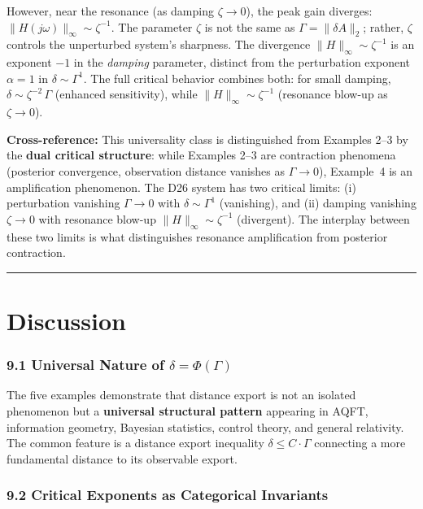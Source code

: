 \documentclass[
]{article}
\begin{document}
However, near the resonance (as damping $\zeta \to 0$), the peak gain diverges: $\|H(j\omega)\|_\infty \sim \zeta^{-1}$. The parameter $\zeta$ is not the same as $\Gamma = \|\delta A\|_2$; rather, $\zeta$ controls the unperturbed system's sharpness. The divergence $\|H\|_\infty \sim \zeta^{-1}$ is an exponent $-1$ in the \emph{damping} parameter, distinct from the perturbation exponent $\alpha = 1$ in $\delta \sim \Gamma^1$. The full critical behavior combines both: for small damping, $\delta \sim \zeta^{-2}\,\Gamma$ (enhanced sensitivity), while $\|H\|_\infty \sim \zeta^{-1}$ (resonance blow-up as $\zeta \to 0$).

\textbf{Cross-reference:} This universality class is distinguished from Examples 2--3 by the \textbf{dual critical structure}: while Examples 2--3 are contraction phenomena (posterior convergence, observation distance vanishes as $\Gamma \to 0$), Example~4 is an amplification phenomenon. The D26 system has two critical limits: (i) perturbation vanishing $\Gamma \to 0$ with $\delta \sim \Gamma^1$ (vanishing), and (ii) damping vanishing $\zeta \to 0$ with resonance blow-up $\|H\|_\infty \sim \zeta^{-1}$ (divergent). The interplay between these two limits is what distinguishes resonance amplification from posterior contraction.

\begin{center}\rule{0.5\linewidth}{0.5pt}\end{center}


\section{Discussion}\label{discussion}

\subsubsection{\texorpdfstring{9.1 Universal Nature of
\(\delta = \Phi(\Gamma)\)}{9.1 Universal Nature of \textbackslash delta = \textbackslash Phi(\textbackslash Gamma)}}\label{universal-nature-of-delta-phigamma}

The five examples demonstrate that distance export is not an isolated
phenomenon but a \textbf{universal structural pattern} appearing in
AQFT, information geometry, Bayesian statistics, control theory, and
general relativity. The common feature is a distance export inequality
\(\delta \leq C \cdot \Gamma\) connecting a more fundamental distance
to its observable export.

\subsubsection{9.2 Critical Exponents as Categorical
Invariants}\label{critical-exponents-as-categorical-invariants}
\end{document}
